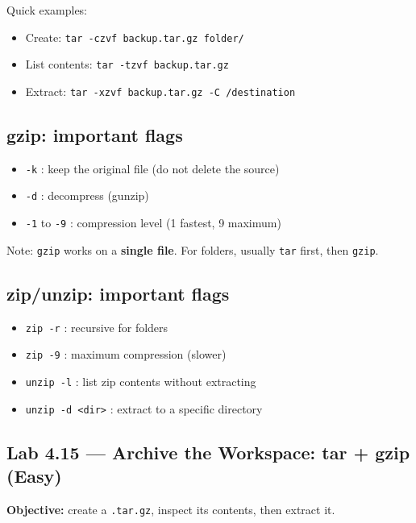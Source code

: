 Quick examples:
\begin{itemize}
    \item Create: \texttt{tar -czvf backup.tar.gz folder/}
    \item List contents: \texttt{tar -tzvf backup.tar.gz}
    \item Extract: \texttt{tar -xzvf backup.tar.gz -C /destination}
\end{itemize}

\subsection*{gzip: important flags}
\begin{itemize}
    \item \texttt{-k} : keep the original file (do not delete the source)
    \item \texttt{-d} : decompress (gunzip)
    \item \texttt{-1} to \texttt{-9} : compression level (1 fastest, 9 maximum)
\end{itemize}
Note: \texttt{gzip} works on a \textbf{single file}. For folders, usually
\texttt{tar} first, then \texttt{gzip}.

\subsection*{zip/unzip: important flags}
\begin{itemize}
    \item \texttt{zip -r} : recursive for folders
    \item \texttt{zip -9} : maximum compression (slower)
    \item \texttt{unzip -l} : list zip contents without extracting
    \item \texttt{unzip -d <dir>} : extract to a specific directory
\end{itemize}

\subsection*{Lab 4.15 --- Archive the Workspace: tar + gzip (Easy)}
\textbf{Objective:} create a \texttt{.tar.gz}, inspect its contents, then
extract it.

